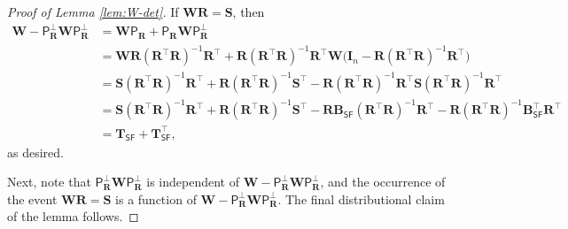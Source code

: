 \documentclass[]{article}
\def\bR{{\boldsymbol R}}
\def\Id{{\mathbf I}}
\def\bW{{\boldsymbol W}}
\def\bT{\boldsymbol{T}}
\def\bS{\boldsymbol{S}}
\def\proj{{\mathsf P}}
\def\bB{{\boldsymbol B}}
\def\bW{{\boldsymbol W}}
\def\proj{{\mathsf P}}
\def\SF{\mathsf{SF}}
\begin{document}
\begin{proof}[Proof of Lemma \ref{lem:W-det}]
    If $\bW \bR = \bS$, 
    then
    \begin{equation}
    \begin{aligned}
        \bW - \proj_{\bR}^\perp \bW \proj_{\bR}^\perp 
            &= 
            \bW \proj_{\bR} + \proj_{\bR} \bW \proj_{\bR}^\perp
        \\
            &= 
            \bW \bR (\bR^\top \bR)^{-1}\bR^\top 
            +
            \bR (\bR^\top \bR)^{-1}\bR^\top \bW \big(\Id_n - \bR (\bR^\top \bR)^{-1}\bR^\top \big)
        \\
            &= 
            \bS (\bR^\top \bR)^{-1}\bR^\top 
            + 
            \bR (\bR^\top \bR)^{-1}\bS^\top 
            - 
            \bR (\bR^\top \bR)^{-1} \bR^\top \bS (\bR^\top \bR)^{-1}\bR^\top 
        \\
            &= 
            \bS (\bR^\top \bR)^{-1}\bR^\top 
            + 
            \bR (\bR^\top \bR)^{-1}\bS^\top 
            - 
            \bR \bB_{\SF} (\bR^\top\bR)^{-1} \bR^\top 
            -
            \bR(\bR^\top \bR)^{-1} \bB_{\SF}^\top \bR^\top
        \\
            &= \bT_{\SF} + \bT_{\SF}^\top,
    \end{aligned}
    \end{equation}
    as desired.

    Next, note that $\proj_{\bR}^\perp \bW \proj_{\bR}^\perp$ is independent of $\bW - \proj_{\bR}^\perp \bW \proj_{\bR}^\perp$, 
    and the occurrence of the event  $\bW \bR = \bS$ is a function of $\bW - \proj_{\bR}^\perp \bW \proj_{\bR}^\perp$.
    The final distributional claim of the lemma follows.
\end{proof}
\end{document}
